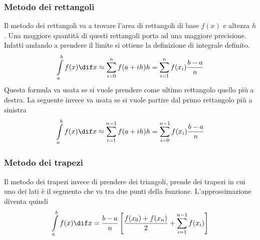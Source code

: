 \subsubsection{Metodo dei rettangoli}
\begin{center}
\end{center}
Il metodo dei rettangoli va a trovare l'area di rettangoli di base $f(x)$ e altezza $h$. Una 
maggiore quantità di questi rettangoli porta ad una maggiore precisione. Infatti andando a prendere
il limite si ottiene la definizione di integrale definito.
\begin{equation*}
  \int\limits_{a}^{b} f(x)\dif x \approx \sum\limits^{n}_{i=0} f(a+ih)h = \sum\limits^{n}_{i=1} f(x_i)
  \frac{b-a}{n}
\end{equation*}
Questa formula va usata se si vuole prendere come ultimo rettangolo quello più a destra. La 
seguente invece va usata se si vuole partire dal primo rettangolo più a sinistra
\begin{equation*}
  \int\limits_{a}^{b} f(x)\dif x \approx \sum\limits^{n-1}_{i=1} f(a+ih)h = \sum\limits^{n-1}_{i=0} 
  f(x_i)\frac{b-a}{n}
\end{equation*}

\subsubsection{Metodo dei trapezi}
\begin{center}
\end{center}
Il metodo dei trapezi invece di prendere dei triangoli, prende dei trapezi in cui uno dei lati è
il segmento che va tra due punti della funzione. L'approssimazione diventa quindi
\begin{equation*}
  \int\limits_{a}^{b} f(x)\dif x = \frac{b-a}{n}\left[ \frac{f(x_0)+f(x_n)}{2}+
  \sum\limits^{n-1}_{i=1} f(x_i) \right]
\end{equation*}
